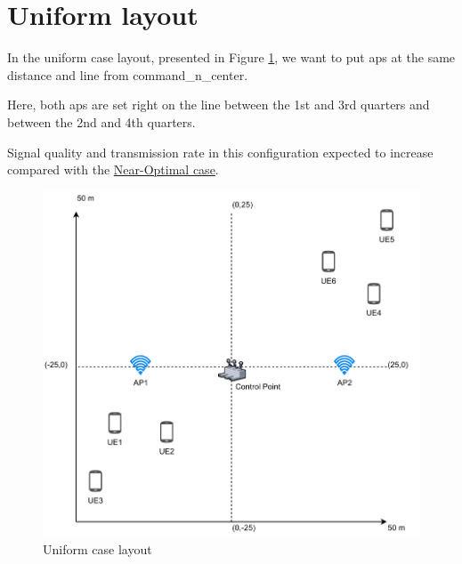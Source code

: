 \section{Uniform layout}\label{uniform-layout}

In the uniform case layout, presented in Figure \ref{fig:uniform-case-layout}, we want to put \glspl{ap} at the same distance and line from \gls{command_n_center}.

Here, both \glspl{ap} are set right on the line between the 1st and 3rd quarters and between the 2nd and 4th quarters.

Signal quality and transmission rate in this configuration expected to increase compared with the \hyperref[near-optimal-layout]{Near-Optimal case}.

\begin{figure}[H]
	\centering
	\includegraphics[width=0.7\linewidth,keepaspectratio]{images/05-cases-description-Uniform.pdf}
	\caption{Uniform case layout}
	\label{fig:uniform-case-layout}
\end{figure}
